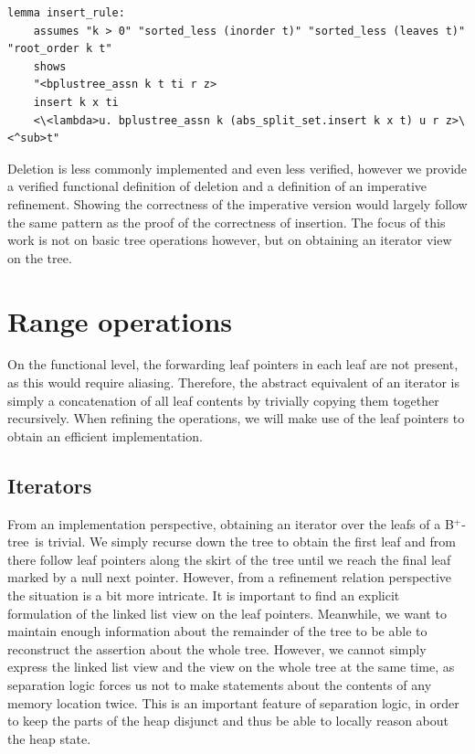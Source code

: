 \documentclass[a4paper,UKenglish,cleveref, autoref, thm-restate]{lipics-v2021}
\newcommand{\btree}{B$^+$-tree}
\begin{document}
\begin{lstlisting}[mathescape=true, language=Isabelle,label=lst:insert-refines]
lemma insert_rule:
    assumes "k > 0" "sorted_less (inorder t)" "sorted_less (leaves t)" "root_order k t"
    shows
    "<bplustree_assn k t ti r z>
    insert k x ti
    <\<lambda>u. bplustree_assn k (abs_split_set.insert k x t) u r z>\<^sub>t"
\end{lstlisting}
  

Deletion is less commonly implemented and even less verified,
however we provide a verified functional definition of deletion and a definition of an imperative refinement.
Showing the correctness of the imperative version would largely follow
the same pattern as the proof of the correctness of insertion.
The focus of this work is not on basic tree operations
however, but on obtaining an iterator view on the tree.


\section{Range operations}
\label{sec:range}

On the functional level, the forwarding leaf pointers in each leaf
are not present, as this would require aliasing.
Therefore, the abstract equivalent of an iterator
is simply a concatenation of all leaf contents by
trivially copying them together recursively.
When refining the operations, we will make use of the leaf pointers
to obtain an efficient implementation.

\subsection{Iterators}
\label{sec:imperative_iter}

From an implementation perspective, obtaining an iterator over the leafs
of a \btree\ is trivial.
We simply recurse down the tree to obtain the first leaf and from there follow leaf
pointers along the skirt of the tree until we reach the final leaf marked by a null next pointer.
However, from a refinement relation perspective the situation is a bit more intricate.
It is important to find an explicit formulation of the linked list view on the leaf pointers.
Meanwhile, we want to maintain enough information about the remainder of the tree
to be able to reconstruct the assertion about the whole tree.
However, we cannot simply express the linked list view and the view on the
whole tree at the same time,
as separation logic forces us not to make statements about the contents of
any memory location twice.
This is an important feature of separation logic,
in order to keep the parts of the heap disjunct and
thus be able to locally reason about the heap state.
\end{document}
